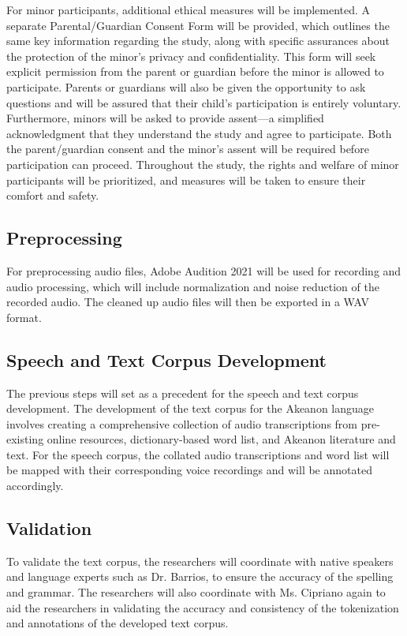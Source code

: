 For minor participants, additional ethical measures will be implemented. A separate Parental/Guardian Consent Form will be provided, which outlines the same key information regarding the study, along with specific assurances about the protection of the minor’s privacy and confidentiality. This form will seek explicit permission from the parent or guardian before the minor is allowed to participate. Parents or guardians will also be given the opportunity to ask questions and will be assured that their child’s participation is entirely voluntary. Furthermore, minors will be asked to provide assent—a simplified acknowledgment that they understand the study and agree to participate. Both the parent/guardian consent and the minor's assent will be required before participation can proceed. Throughout the study, the rights and welfare of minor participants will be prioritized, and measures will be taken to ensure their comfort and safety.

\subsection{Preprocessing}
For preprocessing audio files, Adobe Audition 2021 will be used for recording and audio processing, which will include normalization and noise reduction of the recorded audio. The cleaned up audio files will then be exported in a WAV format.

\subsection{Speech and Text Corpus Development}
The previous steps will set as a precedent for the speech and text corpus development. The development of the text corpus for the Akeanon language involves creating a comprehensive collection of audio transcriptions from pre-existing online resources, dictionary-based word list, and Akeanon literature and text. For the speech corpus, the collated audio transcriptions and word list will be mapped with their corresponding voice recordings and will be annotated accordingly.

\subsection{Validation}

To validate the text corpus, the researchers will coordinate with native speakers and language experts such as Dr. Barrios, to ensure the accuracy of the spelling and grammar. The researchers will also coordinate with Ms. Cipriano again to aid the researchers in validating the accuracy and consistency of the tokenization and annotations of the developed text corpus.

